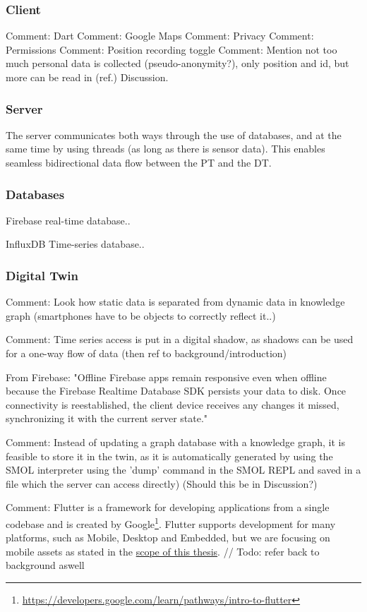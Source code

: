 \documentclass{article}
\begin{document}
\subsubsection{Client}
Comment: Dart
Comment: Google Maps
Comment: Privacy
    Comment: Permissions
    Comment: Position recording toggle
    Comment: Mention not too much personal data is collected (pseudo-anonymity?), only position and id, but more can be read in (ref.) Discussion.

\subsubsection{Server}
The server communicates both ways through the use of databases, and at the same time by using threads (as long as there is sensor data). This enables seamless bidirectional data flow between the PT and the DT.

\subsubsection{Databases}
Firebase real-time database..

InfluxDB Time-series database..
\subsubsection{Digital Twin}


Comment: Look how static data is separated from dynamic data in knowledge graph (smartphones have to be objects to correctly reflect it..)

Comment: Time series access is put in a digital shadow, as shadows can be used for a one-way flow of data (then ref to background/introduction)

From Firebase: "Offline	Firebase apps remain responsive even when offline because the Firebase Realtime Database SDK persists your data to disk. Once connectivity is reestablished, the client device receives any changes it missed, synchronizing it with the current server state." 

Comment: Instead of updating a graph database with a knowledge graph, it is feasible to store it in the twin, as it is automatically generated by using the SMOL interpreter using the 'dump' command in the SMOL REPL and saved in a file which the server can access directly) (Should this be in Discussion?)

Comment: Flutter is a framework for developing applications from a single codebase and is created by Google\footnote{\url{https://developers.google.com/learn/pathways/intro-to-flutter}}. Flutter supports development for many platforms, such as Mobile, Desktop and Embedded, but we are focusing on mobile assets as stated in the \hyperref[subsec:Scope]{scope of this thesis}.
// Todo: refer back to background aswell
\end{document}
